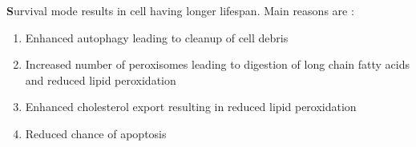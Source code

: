 \textbf Survival mode results in cell having longer lifespan. Main reasons are :
\begin{enumerate}
\item Enhanced autophagy leading to cleanup of cell debris
\item Increased number of peroxisomes leading to digestion of long chain fatty acids and reduced lipid peroxidation
\item Enhanced cholesterol export resulting in reduced lipid peroxidation
\item Reduced chance of apoptosis
\end{enumerate}